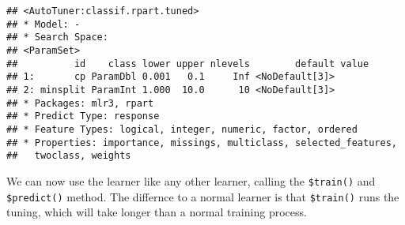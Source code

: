 \documentclass[
]{scrbook}
\newenvironment{Shaded}{\begin{snugshade}}{\end{snugshade}}
\newcommand{\AttributeTok}[1]{\textcolor[rgb]{0.77,0.63,0.00}{#1}}
\newcommand{\DecValTok}[1]{\textcolor[rgb]{0.00,0.00,0.81}{#1}}
\newcommand{\FloatTok}[1]{\textcolor[rgb]{0.00,0.00,0.81}{#1}}
\newcommand{\FunctionTok}[1]{\textcolor[rgb]{0.00,0.00,0.00}{#1}}
\newcommand{\NormalTok}[1]{#1}
\newcommand{\OtherTok}[1]{\textcolor[rgb]{0.56,0.35,0.01}{#1}}
\newcommand{\SpecialCharTok}[1]{\textcolor[rgb]{0.00,0.00,0.00}{#1}}
\newcommand{\StringTok}[1]{\textcolor[rgb]{0.31,0.60,0.02}{#1}}
\renewenvironment{Shaded} {\begin{snugshade}\small} {\end{snugshade}}
\begin{document}
\begin{Shaded}
\end{Shaded}

\begin{verbatim}
## <AutoTuner:classif.rpart.tuned>
## * Model: -
## * Search Space:
## <ParamSet>
##          id    class lower upper nlevels        default value
## 1:       cp ParamDbl 0.001   0.1     Inf <NoDefault[3]>      
## 2: minsplit ParamInt 1.000  10.0      10 <NoDefault[3]>      
## * Packages: mlr3, rpart
## * Predict Type: response
## * Feature Types: logical, integer, numeric, factor, ordered
## * Properties: importance, missings, multiclass, selected_features,
##   twoclass, weights
\end{verbatim}

We can now use the learner like any other learner, calling the \texttt{\$train()} and \texttt{\$predict()} method. The differnce to a normal learner is that \texttt{\$train()} runs the tuning, which will take longer than a normal training process.

\begin{Shaded}
\end{Shaded}
\end{document}
